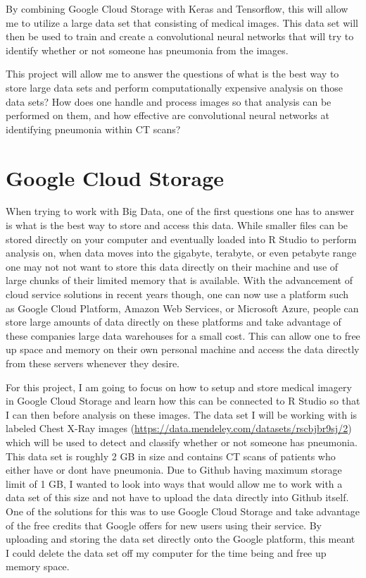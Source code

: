 \documentclass[12pt]{article}
\begin{document}
By combining Google Cloud Storage with Keras and Tensorflow, this will
allow me to utilize a large data set that consisting of medical images.
This data set will then be used to train and create a convolutional
neural networks that will try to identify whether or not someone has
pneumonia from the images.

This project will allow me to answer the questions of what is the best
way to store large data sets and perform computationally expensive
analysis on those data sets? How does one handle and process images so
that analysis can be performed on them, and how effective are
convolutional neural networks at identifying pneumonia within CT scans?

\hypertarget{google-cloud-storage}{%
\section{Google Cloud Storage}\label{google-cloud-storage}}

When trying to work with Big Data, one of the first questions one has to
answer is what is the best way to store and access this data. While
smaller files can be stored directly on your computer and eventually
loaded into R Studio to perform analysis on, when data moves into the
gigabyte, terabyte, or even petabyte range one may not not want to store
this data directly on their machine and use of large chunks of their
limited memory that is available. With the advancement of cloud service
solutions in recent years though, one can now use a platform such as
Google Cloud Platform, Amazon Web Services, or Microsoft Azure, people
can store large amounts of data directly on these platforms and take
advantage of these companies large data warehouses for a small cost.
This can allow one to free up space and memory on their own personal
machine and access the data directly from these servers whenever they
desire.

For this project, I am going to focus on how to setup and store medical
imagery in Google Cloud Storage and learn how this can be connected to R
Studio so that I can then before analysis on these images. The data set
I will be working with is labeled Chest X-Ray images
(\url{https://data.mendeley.com/datasets/rscbjbr9sj/2}) which will be
used to detect and classify whether or not someone has pneumonia. This
data set is roughly 2 GB in size and contains CT scans of patients who
either have or dont have pneumonia. Due to Github having maximum storage
limit of 1 GB, I wanted to look into ways that would allow me to work
with a data set of this size and not have to upload the data directly
into Github itself. One of the solutions for this was to use Google
Cloud Storage and take advantage of the free credits that Google offers
for new users using their service. By uploading and storing the data set
directly onto the Google platform, this meant I could delete the data
set off my computer for the time being and free up memory space.
\end{document}
